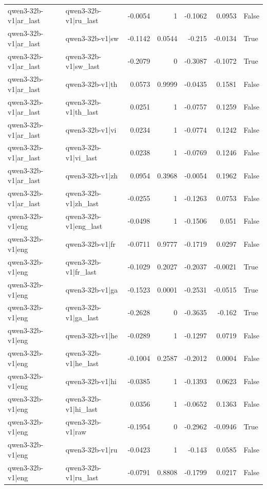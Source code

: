 \begin{table}
\begin{tabular}{l l r r r r l}
qwen3-32b-v1|ar_last & qwen3-32b-v1|ru_last & -0.0054 & 1 & -0.1062 & 0.0953 & False \\
qwen3-32b-v1|ar_last & qwen3-32b-v1|sw & -0.1142 & 0.0544 & -0.215 & -0.0134 & True \\
qwen3-32b-v1|ar_last & qwen3-32b-v1|sw_last & -0.2079 & 0 & -0.3087 & -0.1072 & True \\
qwen3-32b-v1|ar_last & qwen3-32b-v1|th & 0.0573 & 0.9999 & -0.0435 & 0.1581 & False \\
qwen3-32b-v1|ar_last & qwen3-32b-v1|th_last & 0.0251 & 1 & -0.0757 & 0.1259 & False \\
qwen3-32b-v1|ar_last & qwen3-32b-v1|vi & 0.0234 & 1 & -0.0774 & 0.1242 & False \\
qwen3-32b-v1|ar_last & qwen3-32b-v1|vi_last & 0.0238 & 1 & -0.0769 & 0.1246 & False \\
qwen3-32b-v1|ar_last & qwen3-32b-v1|zh & 0.0954 & 0.3968 & -0.0054 & 0.1962 & False \\
qwen3-32b-v1|ar_last & qwen3-32b-v1|zh_last & -0.0255 & 1 & -0.1263 & 0.0753 & False \\
qwen3-32b-v1|eng & qwen3-32b-v1|eng_last & -0.0498 & 1 & -0.1506 & 0.051 & False \\
qwen3-32b-v1|eng & qwen3-32b-v1|fr & -0.0711 & 0.9777 & -0.1719 & 0.0297 & False \\
qwen3-32b-v1|eng & qwen3-32b-v1|fr_last & -0.1029 & 0.2027 & -0.2037 & -0.0021 & True \\
qwen3-32b-v1|eng & qwen3-32b-v1|ga & -0.1523 & 0.0001 & -0.2531 & -0.0515 & True \\
qwen3-32b-v1|eng & qwen3-32b-v1|ga_last & -0.2628 & 0 & -0.3635 & -0.162 & True \\
qwen3-32b-v1|eng & qwen3-32b-v1|he & -0.0289 & 1 & -0.1297 & 0.0719 & False \\
qwen3-32b-v1|eng & qwen3-32b-v1|he_last & -0.1004 & 0.2587 & -0.2012 & 0.0004 & False \\
qwen3-32b-v1|eng & qwen3-32b-v1|hi & -0.0385 & 1 & -0.1393 & 0.0623 & False \\
qwen3-32b-v1|eng & qwen3-32b-v1|hi_last & 0.0356 & 1 & -0.0652 & 0.1363 & False \\
qwen3-32b-v1|eng & qwen3-32b-v1|raw & -0.1954 & 0 & -0.2962 & -0.0946 & True \\
qwen3-32b-v1|eng & qwen3-32b-v1|ru & -0.0423 & 1 & -0.143 & 0.0585 & False \\
qwen3-32b-v1|eng & qwen3-32b-v1|ru_last & -0.0791 & 0.8808 & -0.1799 & 0.0217 & False \\

\end{tabular}
\end{table}
